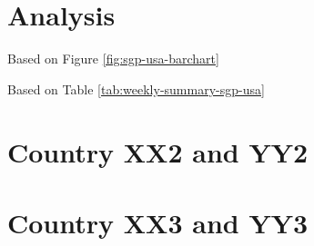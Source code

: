 \documentclass[11pt,a4paper,]{article}
\begin{document}
\hypertarget{analysis}{%
\section{Analysis}\label{analysis}}

Based on Figure \ref{fig:sgp-usa-barchart}

Based on Table \ref{tab:weekly-summary-sgp-usa}

\section*{Country XX2 and YY2}

\section*{Country XX3 and YY3}

\printbibliography
\end{document}
